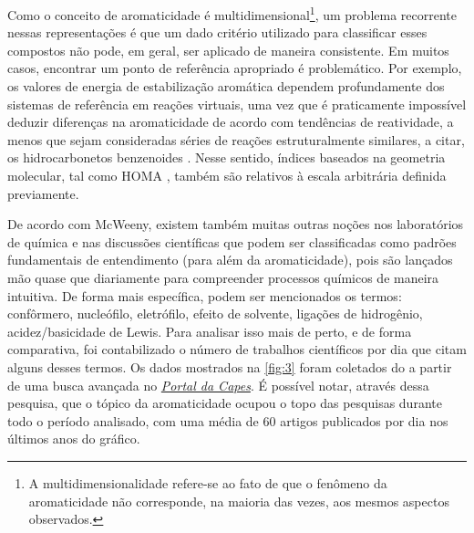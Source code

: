 Como o conceito de aromaticidade é multidimensional\footnote{A multidimensionalidade refere-se ao fato de que o fenômeno da aromaticidade não corresponde, na maioria das vezes, aos mesmos aspectos observados.}, um problema recorrente nessas representações é que um dado critério utilizado para classificar esses compostos não pode, em geral, ser aplicado de maneira consistente. Em muitos casos, encontrar um ponto de referência apropriado é problemático. Por exemplo, os valores de energia de estabilização aromática dependem profundamente dos sistemas de referência em reações virtuais, uma vez que é praticamente impossível deduzir diferenças na aromaticidade de acordo com tendências de reatividade, a menos que sejam consideradas séries de reações estruturalmente similares, a citar, os hidrocarbonetos benzenoides \autocite{Ciesielski2009, Krygowski2014}. Nesse sentido, índices baseados na geometria molecular, tal como \gls{HOMA} \autocite{Kruszewski1972}, também são relativos à escala arbitrária definida previamente.

De acordo com McWeeny, existem também muitas outras noções nos laboratórios de química e nas discussões científicas que podem ser classificadas como padrões fundamentais de entendimento (para além da aromaticidade), pois são lançados mão quase que diariamente para compreender processos químicos de maneira intuitiva. De forma mais específica, podem ser mencionados os termos: confôrmero, nucleófilo, eletrófilo, efeito de solvente, ligações de hidrogênio, acidez/basicidade de Lewis. Para analisar isso mais de perto, e de forma comparativa, foi contabilizado o número de trabalhos científicos por dia que citam alguns desses termos. Os dados mostrados na \autoref{fig:3} foram coletados do a partir de uma busca avançada no \href{https://www-periodicos-capes-gov-br.ez46.periodicos.capes.gov.br/index.php?}{\textit{Portal da Capes}}. É possível notar, através dessa pesquisa, que o tópico da aromaticidade ocupou o topo das pesquisas durante todo o período analisado, com uma média de 60 artigos publicados por dia nos últimos anos do gráfico. 


